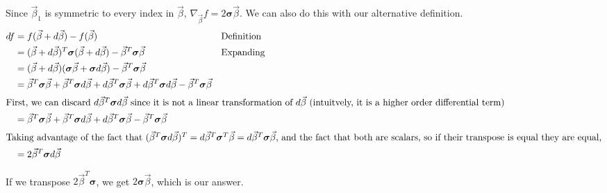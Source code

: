 \documentclass[11pt, oneside]{article}
\begin{document}
Since \( \vec{\beta}_1 \) is symmetric to every index in \( \vec{\beta} \),
\( \nabla_{\vec{\beta}} f = 2 \bm{\sigma} \vec{\beta} \).
We can also do this with our alternative definition.
\begin{align*}
    df &= f(\vec{\beta} + d\vec{\beta}) - f(\vec{\beta}) && \text{Definition} \\
       &= (\vec{\beta} + d\vec{\beta})^T\bm{\sigma}(\vec{\beta} + d\vec{\beta}) -
    \vec{\beta}^T\bm{\sigma}\vec{\beta} && \text{Expanding} \\
      &= (\vec{\beta} + d\vec{\beta})(\bm{\sigma} \vec{\beta}
      + \bm{\sigma}d\vec{\beta}) - \vec{\beta}^T \bm{\sigma} \vec{\beta} \\
      &= \vec{\beta}^T\bm{\sigma}\vec{\beta} + \vec{\beta}^T\bm{\sigma}d\vec{\beta} +
      d \vec{\beta}^T\bm{\sigma}\vec{\beta} + d \vec{\beta}^T\bm{\sigma}d \vec{\beta}
      - \vec{\beta}^T\bm{\sigma}\vec{\beta} \\
      \shortintertext{First, we can discard \( d \vec{\beta}^T\bm{\sigma}d \vec{\beta} \)
      since it is not a linear transformation of \( d \vec{\beta} \) 
      (intuitvely, it is a higher order differential term)}
      &= \vec{\beta}^T\bm{\sigma}\vec{\beta} + \vec{\beta}^T\bm{\sigma}d\vec{\beta} +
      d \vec{\beta}^T\bm{\sigma}\vec{\beta} - \vec{\beta}^T\bm{\sigma}\vec{\beta} \\
      \shortintertext{Taking advantage of the fact that \((\vec{\beta}^T\bm{\sigma}d \vec{\beta})^T
      = d \vec{\beta}^T\bm{\sigma}^T\vec{\beta} = d\vec{\beta}^T\bm{\sigma}\vec{\beta} \),
  and the fact that both are scalars, so if their transpose is equal they are equal,}
      &= 2 \vec{\beta}^T\bm{\sigma} d \vec{\beta} 
\end{align*}

If we transpose \( 2 \vec{\beta}^T\bm{\sigma} \), we get \( 2 \bm{\sigma} \vec{\beta} \),
which is our answer.
\end{document}
